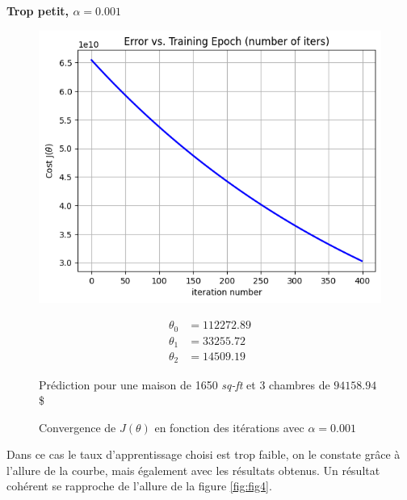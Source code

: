 \vspace{.5cm}
\noindent
\textbf{Trop petit, $\alpha = 0.001$}
\vspace{.2cm}

\begin{figure}[!h]
    \begin{minipage}{.48\linewidth}
        \begin{center}
            \includegraphics[width=1\textwidth]{./img/lowlearningrateng.png}
            \caption{\label{fig:fig5}Convergence de $J(\theta)$ en fonction des itérations avec $\alpha = 0.001$}  
        \end{center}
    \end{minipage}\hfill
    \begin{minipage}{.48\linewidth}
        \begin{equation*}
            \begin{aligned}
                \theta_0 &= 112272.89 \\
                \theta_1 &= 33255.72 \\
                \theta_2 &= 14509.19
            \end{aligned}
        \end{equation*}  

        Prédiction pour une maison de 1650 \textit{sq-ft} et 3 chambres de $94158.94$\$
    \end{minipage}
\end{figure}


Dans ce cas le taux d'apprentissage choisi est trop faible, on le constate grâce à l'allure de la courbe, mais également avec les résultats obtenus. Un résultat cohérent se rapproche de l'allure de la figure \ref{fig:fig4}.


